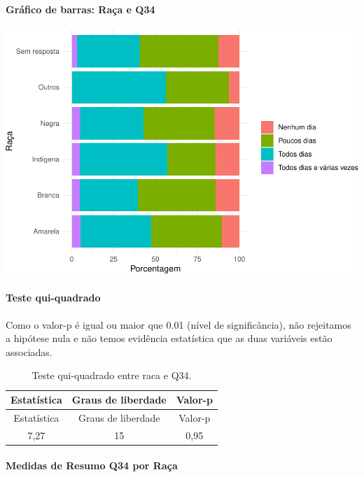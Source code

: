 \documentclass[]{article}
\let\oldparagraph\paragraph
\renewcommand{\paragraph}[1]{\oldparagraph{#1}\mbox{}}
\begin{document}
\hypertarget{gruxe1fico-de-barras-rauxe7a-e-q34}{%
\paragraph{Gráfico de barras: Raça e Q34}\label{gruxe1fico-de-barras-rauxe7a-e-q34}}

\begin{center}\includegraphics[width=0.75\linewidth]{relatorio_covid19_files/figure-latex/unnamed-chunk-1224-1} \end{center}

\hypertarget{teste-qui-quadrado-105}{%
\paragraph{Teste qui-quadrado}\label{teste-qui-quadrado-105}}

Como o valor-p é igual ou maior que 0.01 (nível de significância), não rejeitamos a hipótese nula e não temos evidência estatística que as duas variáveis estão associadas.

\begin{longtable}[]{@{}ccc@{}}
\caption{\label{tab:unnamed-chunk-1226}Teste qui-quadrado entre raca e Q34.}\tabularnewline
\toprule
Estatística & Graus de liberdade & Valor-p\tabularnewline
\midrule
\endfirsthead
\toprule
Estatística & Graus de liberdade & Valor-p\tabularnewline
\midrule
\endhead
7,27 & 15 & 0,95\tabularnewline
\bottomrule
\end{longtable}

\cleardoublepage

\hypertarget{medidas-de-resumo-q34-por-rauxe7a}{%
\paragraph{Medidas de Resumo Q34 por Raça}\label{medidas-de-resumo-q34-por-rauxe7a}}
\end{document}
